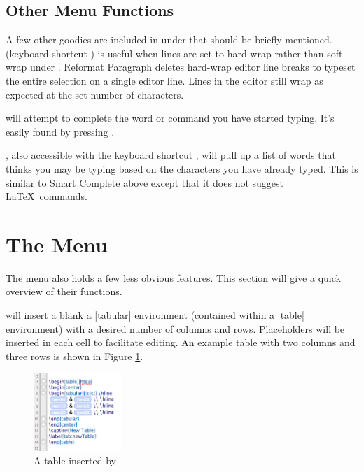\subsection[Other Edit Menu Functions]{Other  Menu Functions}
\label{reference.edit.other}
A few other goodies are included in under  that should be briefly mentioned.  (keyboard shortcut ) is useful when lines are set to hard wrap rather than soft wrap under . Reformat Paragraph deletes hard-wrap editor line breaks to typeset the entire selection on a single editor line. Lines in the editor still wrap as expected at the set number of characters.

 will attempt to complete the word or command you have started typing. It's easily found by pressing \keys{\esckey}.

, also accessible with the keyboard shortcut , will pull up a list of words that \texnicle thinks you may be typing based on the characters you have already typed. This is similar to Smart Complete above except that it does not suggest \LaTeX\ commands.

\section[The Editor Menu]{The  Menu}
\label{reference.editortable}
The  menu also holds a few less obvious \texnicle features. This section will give a quick overview of their functions.

 will insert a blank a |tabular| environment (contained within a |table| environment) with a desired number of columns and rows. Placeholders will be inserted in each cell to facilitate editing. An example table with two columns and three rows is shown in Figure \ref{fig:texnicle-inserttable}.

\begin{figure}[htbp]
\centering
\includegraphics[width=0.3\textwidth]{TeXnicle-Images/texnicle-inserttable.png}
\caption{A table inserted by \texnicle}
\label{fig:texnicle-inserttable}
\end{figure}

